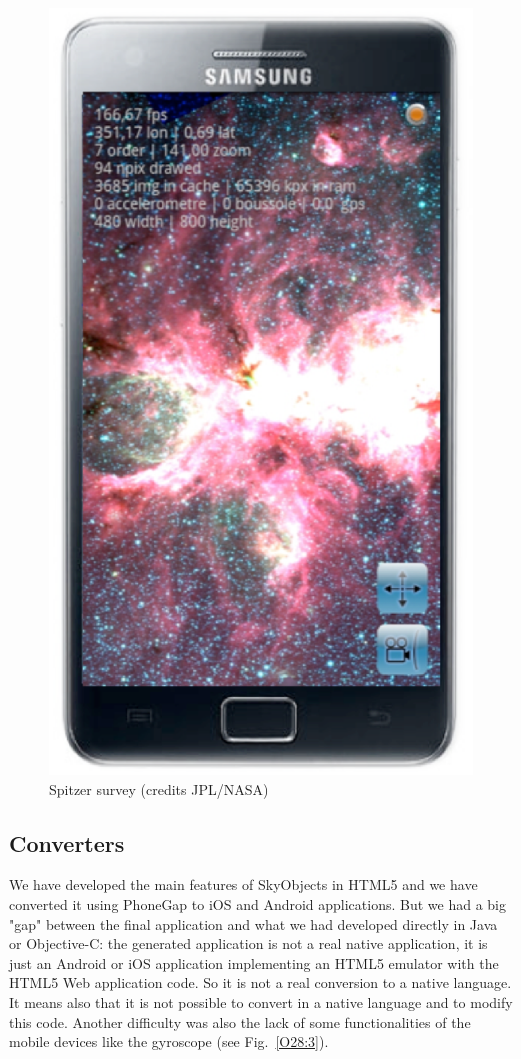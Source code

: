 \begin{figure}[h]
\includegraphics[scale=0.28]{part5/Schaaff_O28/O28_f3.eps}
\caption{Spitzer survey (credits JPL/NASA)} 
\label{O28:2}
\end{figure}

\subsection{Converters}
We have developed the main features of SkyObjects in HTML5 and we have converted it using PhoneGap to iOS and Android applications. But we had a big "gap" between the final application and what we had developed directly in Java or Objective-C: the generated application is not a real native application, it is just an Android or iOS application implementing an HTML5 emulator with the HTML5 Web application code. So it is not a real conversion to a native language. 
It means also that it is not possible to convert in a native language and to modify this code.
Another difficulty was also the lack of some functionalities of the mobile devices like the gyroscope  (see Fig.~\ref{O28:3}).

